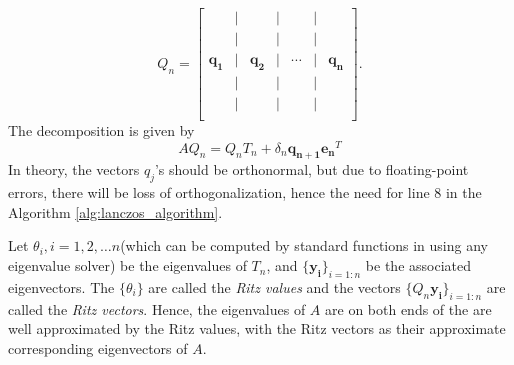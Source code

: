 	\[
	Q_n = 
	\begin{bmatrix}
		 & \big| &  & \big| &  & \big| &  \\
		 & \big| &  & \big| &  & \big| &  \\
		 \mathbf{q_1} & \big| & \mathbf{q_2} & \big| & \cdots & \big| & \mathbf{q_n} \\
		 & \big| &  & \big| &  & \big| &  \\
		 & \big| &  & \big| &  & \big| &  \\
	\end{bmatrix}.
	\]
The decomposition is given by
\begin{equation}\label{eq:Lanczos_Decomposition}
	AQ_n = Q_nT_n + \delta_{n}\mathbf{q_{n+1}}\mathbf{e_n}^T
\end{equation}
In theory, the vectors $q_j$'s should be orthonormal, but due to floating-point errors, there will be loss of orthogonalization, hence the need for line 8 in the Algorithm \ref{alg:lanczos_algorithm}.

Let $\theta_i, i = 1,2, \ldots n$(which can be computed by standard functions in using any eigenvalue solver) be the eigenvalues of $T_n$, and $\{\mathbf{y_i}\}_{i = 1 : n}$ be the associated eigenvectors. The $\{\theta_i\}$ are called the \textit{Ritz values} and the vectors $\{Q_n\mathbf{y_i}\}_{i = 1 : n}$ are called the \textit{Ritz vectors}. Hence, the eigenvalues of $A$ are on both ends of the are well approximated by the Ritz values, with the Ritz vectors as their approximate corresponding eigenvectors of $A$.

